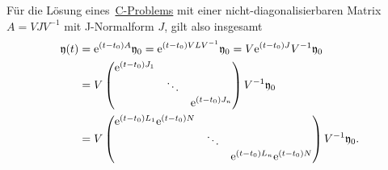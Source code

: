 \begin{remark*}
    Für die Lösung eines~\hyperref[eq:cp]{C-Problems} mit einer nicht-diagonalisierbaren Matrix $A = V J V^{-1}$
    mit J-Normalform $J$, gilt also insgesamt
    \begin{align*}
        \mathfrak{y}(t) &= \mathrm{e}^{(t - t_0) A} \mathfrak{y}_0 = \mathrm{e}^{(t - t_0) V L V^{-1}} \mathfrak{y}_0 = V \mathrm{e}^{(t - t_0) J} V^{-1} \mathfrak{y}_0\\
        &= V \begin{pmatrix}
                \mathrm{e}^{(t - t_0) J_1} &        & \\
                                   & \ddots & \\
                                   &        & \mathrm{e}^{(t - t_0) J_n}
            \end{pmatrix} V^{-1} \mathfrak{y}_0\\
        &= V \begin{pmatrix}
                \mathrm{e}^{(t - t_0) L_1} \mathrm{e}^{(t - t_0) N} &        & \\
                                                    & \ddots & \\
                                                    &        & \mathrm{e}^{(t - t_0) L_n} \mathrm{e}^{(t - t_0) N}
            \end{pmatrix} V^{-1} \mathfrak{y}_0.
    \end{align*}
\end{remark*}

